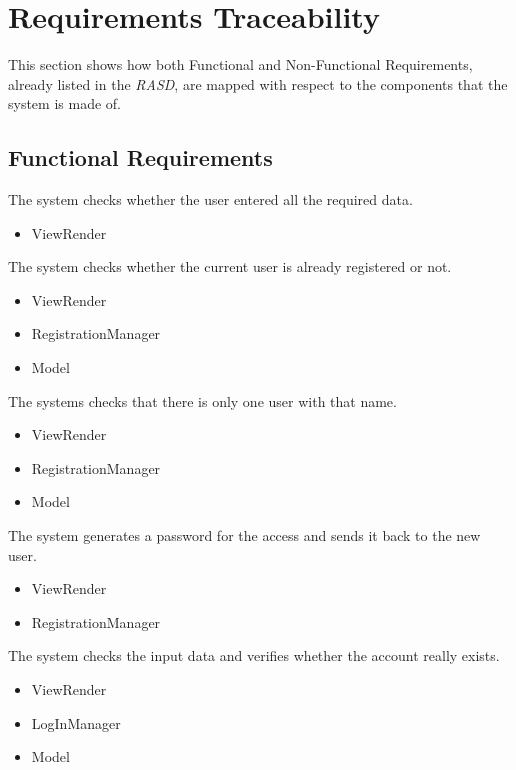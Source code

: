 \documentclass[11pt,a4paper]{report}
\begin{document}
\chapter{Requirements Traceability}
This section shows how both Functional and Non-Functional Requirements, already listed in the \textit{RASD}, are mapped with respect to the components that the system is made of.
\section{Functional Requirements}
	\begin{Req}
		\item The system checks whether the user entered all the required data.
			\begin{itemize}
				\item ViewRender
			\end{itemize}
		\item The system checks whether the current user is already registered or not.
			\begin{itemize}
				\item ViewRender
				\item RegistrationManager
				\item Model
			\end{itemize}
		\item The systems checks that there is only one user with that name.
			\begin{itemize}
				\item ViewRender
				\item RegistrationManager
				\item Model
			\end{itemize}
		\item The system generates a password for the access and sends it back to the new user.
			\begin{itemize}
				\item ViewRender
				\item RegistrationManager
			\end{itemize}
		\item  The system checks the input data and verifies whether the account really exists.
			\begin{itemize}
				\item ViewRender
				\item LogInManager
				\item Model

\end{itemize}
\end{Req}
\end{document}
